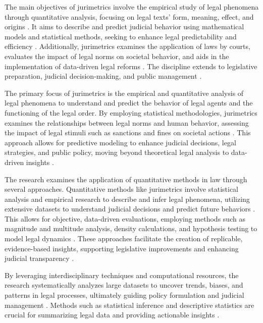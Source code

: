 The main objectives of jurimetrics involve the empirical study of legal phenomena through quantitative analysis, focusing on legal texts' form, meaning, effect, and origins \cite{de2010}. It aims to describe and predict judicial behavior using mathematical models and statistical methods, seeking to enhance legal predictability and efficiency \cite{loevinger1949, nunes2018_133-134}. Additionally, jurimetrics examines the application of laws by courts, evaluates the impact of legal norms on societal behavior, and aids in the implementation of data-driven legal reforms \cite{nunes2018_92-93, nunes2018_91-92, massuanganhe2016_26-27}. The discipline extends to legislative preparation, judicial decision-making, and public management \cite{zabala1809_1-1}.

The primary focus of jurimetrics is the empirical and quantitative analysis of legal phenomena to understand and predict the behavior of legal agents and the functioning of the legal order. By employing statistical methodologies, jurimetrics examines the relationships between legal norms and human behavior, assessing the impact of legal stimuli such as sanctions and fines on societal actions \cite{nunes2018_84-85, loevinger1949_3-4, nunes2018_91-92, luvizotto2020_5-6}. This approach allows for predictive modeling to enhance judicial decisions, legal strategies, and public policy, moving beyond theoretical legal analysis to data-driven insights \cite{nunes2018_108-109, nunes2018_82-83}.

The research examines the application of quantitative methods in law through several approaches. Quantitative methods like jurimetrics involve statistical analysis and empirical research to describe and infer legal phenomena, utilizing extensive datasets to understand judicial decisions and predict future behaviors \cite{colombo2017, luvizotto2020, nunes2018_138-139, massuanganhe2016_25-26}. This allows for objective, data-driven evaluations, employing methods such as magnitude and multitude analysis, density calculations, and hypothesis testing to model legal dynamics \cite{nunes2018_126-127, nunes2018_96-96}. These approaches facilitate the creation of replicable, evidence-based insights, supporting legislative improvements and enhancing judicial transparency \cite{massuanganhe2016_25-25, nunes2018_90-90, silva2023}.

By leveraging interdisciplinary techniques and computational resources, the research systematically analyzes large datasets to uncover trends, biases, and patterns in legal processes, ultimately guiding policy formulation and judicial management \cite{machado2017_48-50, de2010_13-14, ribeiro2021_3-3}. Methods such as statistical inference and descriptive statistics are crucial for summarizing legal data and providing actionable insights \cite{massuanganhe2016_24-25, zabala2019_18-18}.

